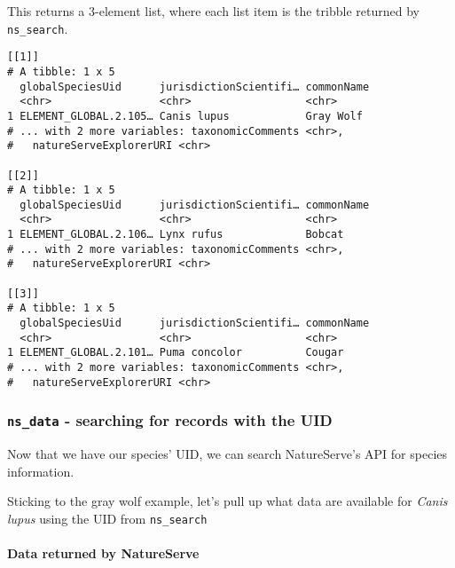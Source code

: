 \documentclass[]{article}
\newenvironment{Shaded}{\begin{snugshade}}{\end{snugshade}}
\newcommand{\KeywordTok}[1]{\textcolor[rgb]{0.13,0.29,0.53}{\textbf{#1}}}
\newcommand{\NormalTok}[1]{#1}
\newcommand{\OperatorTok}[1]{\textcolor[rgb]{0.81,0.36,0.00}{\textbf{#1}}}
\newcommand{\StringTok}[1]{\textcolor[rgb]{0.31,0.60,0.02}{#1}}
\let\oldparagraph\paragraph
\renewcommand{\paragraph}[1]{\oldparagraph{#1}\mbox{}}
\begin{document}
This returns a 3-element list, where each list item is the tribble
returned by \texttt{ns\_search}.

\begin{verbatim}
[[1]]
# A tibble: 1 x 5
  globalSpeciesUid      jurisdictionScientifi… commonName
  <chr>                 <chr>                  <chr>     
1 ELEMENT_GLOBAL.2.105… Canis lupus            Gray Wolf 
# ... with 2 more variables: taxonomicComments <chr>,
#   natureServeExplorerURI <chr>

[[2]]
# A tibble: 1 x 5
  globalSpeciesUid      jurisdictionScientifi… commonName
  <chr>                 <chr>                  <chr>     
1 ELEMENT_GLOBAL.2.106… Lynx rufus             Bobcat    
# ... with 2 more variables: taxonomicComments <chr>,
#   natureServeExplorerURI <chr>

[[3]]
# A tibble: 1 x 5
  globalSpeciesUid      jurisdictionScientifi… commonName
  <chr>                 <chr>                  <chr>     
1 ELEMENT_GLOBAL.2.101… Puma concolor          Cougar    
# ... with 2 more variables: taxonomicComments <chr>,
#   natureServeExplorerURI <chr>
\end{verbatim}

\hypertarget{ns_data---searching-for-records-with-the-uid}{%
\subsubsection{\texorpdfstring{\texttt{ns\_data} - searching for records
with the
UID}{ns\_data - searching for records with the UID}}\label{ns_data---searching-for-records-with-the-uid}}

Now that we have our species' UID, we can search NatureServe's API for
species information.

Sticking to the gray wolf example, let's pull up what data are available
for \emph{Canis lupus} using the UID from \texttt{ns\_search}

\begin{Shaded}
\end{Shaded}

\hypertarget{data-returned-by-natureserve}{%
\paragraph{Data returned by
NatureServe}\label{data-returned-by-natureserve}}
\end{document}
